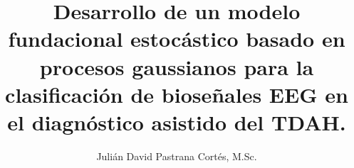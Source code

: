 \usepackage[es-tabla]{babel}
\usepackage{parskip}
\usepackage[capitalise, noabbrev]{cleveref}



\title{
	\textbf{
		Desarrollo de un modelo fundacional estocástico basado en procesos gaussianos para la clasificación de bioseñales EEG en el diagnóstico asistido del TDAH.
	}
	}
\author{
	Julián David Pastrana Cortés, M.Sc.
	}


\date{}